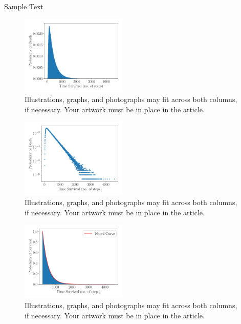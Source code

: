 \documentclass[journal]{IEEEtran}
\begin{document}
Sample Text

\begin{figure}[H]%
  \begin{center}
    \includegraphics[width=0.45\textwidth]{images/exp_plot.pdf}
    \caption{Illustrations, graphs, and photographs may fit across both columns, if necessary. Your artwork must be in place in the article.}
    \label{fig:exp_plot}
  \end{center}
\end{figure}


\begin{figure}[H]%
  \begin{center}
    \includegraphics[width=0.45\textwidth]{images/line_plot.pdf}
    \caption{Illustrations, graphs, and photographs may fit across both columns, if necessary. Your artwork must be in place in the article.}
    \label{fig:line_plot}
  \end{center}
\end{figure}


\begin{figure}[H]%
  \begin{center}
    \includegraphics[width=0.45\textwidth]{images/cum_exp_plot.pdf}
    \caption{Illustrations, graphs, and photographs may fit across both columns, if necessary. Your artwork must be in place in the article.}
    \label{fig:cum_exp_plot}
  \end{center}
\end{figure}
\end{document}
